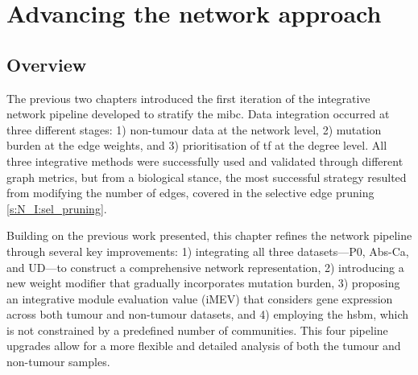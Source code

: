 
\chapter{Advancing the network approach} \label{s:N_II}


\vspace{3mm}
\vspace{3mm}


\section{Overview}

The previous two chapters introduced the first iteration of the integrative network pipeline developed to stratify the \acrfull{mibc}. Data integration occurred at three different stages: 1) non-tumour data at the network level, 2) mutation burden at the edge weights, and 3) prioritisation of \acrfull{tf} at the degree level. All three integrative methods were successfully used and validated through different graph metrics, but from a biological stance, the most successful strategy resulted from modifying the number of edges, covered in the selective edge pruning \cref{s:N_I:sel_pruning}.


Building on the previous work presented, this chapter refines the network pipeline through several key improvements: 1) integrating all three datasets—P0, Abs-Ca, and UD—to construct a comprehensive network representation, 2) introducing a new weight modifier that gradually incorporates mutation burden, 3) proposing an integrative module evaluation value (iMEV) that considers gene expression across both tumour and non-tumour datasets, and 4) employing the \acrfull{hsbm}, which is not constrained by a predefined number of communities. This four pipeline upgrades allow for a more flexible and detailed analysis of both the tumour and non-tumour samples.


